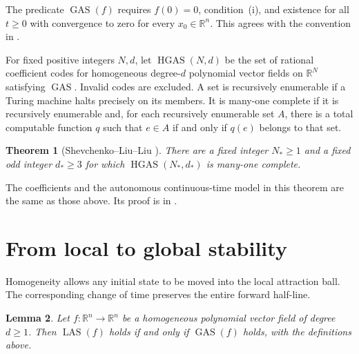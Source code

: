\documentclass[11pt]{article}
\newtheorem{theorem}{Theorem}
\newtheorem{lemma}[theorem]{Lemma}
\newcommand{\R}{\mathbb R}
\newcommand{\LAS}{\operatorname{LAS}}
\newcommand{\GAS}{\operatorname{GAS}}
\newcommand{\HGAS}{\operatorname{HGAS}}
\begin{document}
The predicate $\GAS(f)$ requires $f(0)=0$, condition~(i), and existence for all
$t\geq0$ with convergence to zero for every $x_0\in\R^n$. This agrees with
the convention in \cite[\S1.1]{SLL}.

For fixed positive integers $N,d$, let $\HGAS(N,d)$ be the set of rational
coefficient codes for homogeneous degree-$d$ polynomial vector fields on
$\R^N$ satisfying $\GAS$. Invalid codes are excluded. A set is recursively
enumerable if a Turing machine halts precisely on its members. It is
many-one complete if it is recursively enumerable and, for each recursively
enumerable set $A$, there is a total computable function $q$ such that
$e\in A$ if and only if $q(e)$ belongs to that set.

\begin{theorem}[{Shevchenko--Liu--Liu \cite[Theorem~1.5, p.~4]{SLL}}]
There are a fixed integer $N_*\geq1$ and a fixed odd integer $d_*\geq3$ for
which $\HGAS(N_*,d_*)$ is many-one complete.
\end{theorem}

The coefficients and the autonomous continuous-time model in this theorem
are the same as those above. Its proof is in \cite[\S15, pp.~44--45]{SLL}.

\section{From local to global stability}

Homogeneity allows any initial state to be moved into the local attraction
ball. The corresponding change of time preserves the entire forward half-line.

\begin{lemma}\label{lem:scaling}
Let $f:\R^n\to\R^n$ be a homogeneous polynomial vector field of degree
$d\geq1$. Then $\LAS(f)$ holds if and only if $\GAS(f)$ holds, with the
definitions above.
\end{lemma}
\end{document}
